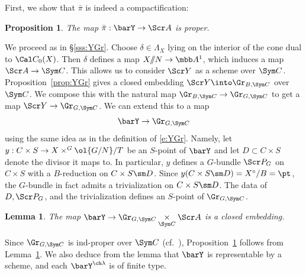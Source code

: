 \documentclass[final]{amsart}
\newtheorem{lem}[subsubsection]{Lemma}
\newtheorem{prop}[subsubsection]{Proposition}
\theoremstyle{remark}
\theoremstyle{definition}
\numberwithin{equation}{section}
\begin{document}
\medskip


First, we show that $\bar\pi$ is indeed a compactification:

\begin{prop} \label{prop:piproper}
The map $\bar \pi :\barY\to \Scr A$ is proper.
\end{prop}

We proceed as in \S\ref{sss:YGr}. 
Choose $\delta\in \Lambda_X$ lying on the interior of the cone 
dual to $\Cal C_0(X)$.
Then $\delta$ defines a map $X/\!\!/N \to \mbb A^1$, which induces a map 
$\Scr A \to \Sym C$. 
This allows us to consider $\Scr Y$ as a scheme over $\Sym C$.
Proposition~\ref{prop:YGr} gives
a closed embedding $\Scr Y \into \Gr_{B,\Sym C}$ over $\Sym C$. 
We compose this with the natural map $\Gr_{B,\Sym C} \to \Gr_{G,\Sym C}$
to get a map $\Scr Y \to \Gr_{G,\Sym C}$. 
We can extend this to a map 
\begin{equation} \label{e:barYGr}
\barY \to \Gr_{G,\Sym C} 
\end{equation}
using the same idea as in the definition of \eqref{e:YGr}. Namely, 
let $y: C\times S \to X \times^G \ol{G/N} / T$ be an $S$-point of $\barY$
and let $D\subset C\times S$ denote the divisor it maps to. 
In particular, $y$ defines a $G$-bundle $\Scr P_G$ on $C\times S$ 
with a $B$-reduction on $C\times S\sm D$. Since $y(C\times S\sm D) = X^\circ/B =\pt$,
the $G$-bundle in fact admits a trivialization on $C\times S\sm D$. 
The data of $D, \Scr P_G$, and the trivialization defines an $S$-point of $\Gr_{G,\Sym C}$.

\begin{lem} \label{lem:barYGr}
The map $\barY \to \Gr_{G,\Sym C} \underset{\Sym C}\times \Scr A$
is a closed embedding.
\end{lem}

Since $\Gr_{G,\Sym C}$ is ind-proper over $\Sym C$ (cf.~\cite[Remark 3.1.4]{Xinwen}), 
Proposition~\ref{prop:piproper} follows from Lemma~\ref{lem:barYGr}.
We also deduce from the lemma that $\barY$ is representable by a scheme, and 
each $\barY^{\ch\lambda}$ is of finite type.
\end{document}
